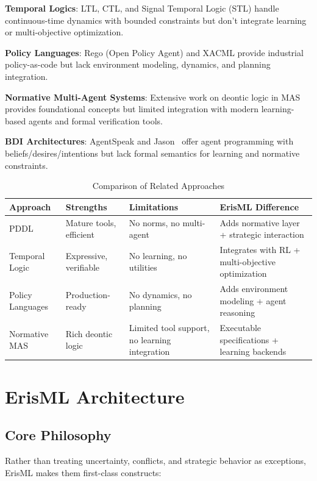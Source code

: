 \documentclass[conference]{IEEEtran}
\begin{document}
\textbf{Temporal Logics}: LTL, CTL, and Signal Temporal Logic (STL)
handle continuous-time dynamics with bounded constraints but don't
integrate learning or multi-objective optimization.

\textbf{Policy Languages}: Rego (Open Policy Agent) and XACML provide
industrial policy-as-code but lack environment modeling, dynamics, and
planning integration.

\textbf{Normative Multi-Agent Systems}: Extensive work on deontic logic
in MAS~\cite{carmo2002,dignum2004,sergot2001} provides foundational concepts but limited
integration with modern learning-based agents and formal verification
tools.

\textbf{BDI Architectures}: AgentSpeak and Jason~\cite{bordini2007} offer agent
programming with beliefs/desires/intentions but lack formal semantics
for learning and normative constraints.

\begin{table}[t]
\caption{Comparison of Related Approaches}
\label{tab:comparison}
\centering
\footnotesize
\begin{tabular}{@{}p{1.4cm}p{1.6cm}p{1.8cm}p{2.2cm}@{}}
\toprule
Approach & Strengths & Limitations & ErisML Difference \\
\midrule
PDDL & Mature tools, efficient & No norms, no multi-agent & Adds normative layer + strategic interaction \\
Temporal Logic & Expressive, verifiable & No learning, no utilities & Integrates with RL + multi-objective optimization \\
Policy Languages & Production-ready & No dynamics, no planning & Adds environment modeling + agent reasoning \\
Normative MAS & Rich deontic logic & Limited tool support, no learning integration & Executable specifications + learning backends \\
\bottomrule
\end{tabular}
\end{table}

\section{ErisML Architecture}
\label{sec:architecture}

\subsection{Core Philosophy}

Rather than treating uncertainty, conflicts, and strategic behavior as
exceptions, ErisML makes them first-class constructs:
\end{document}
